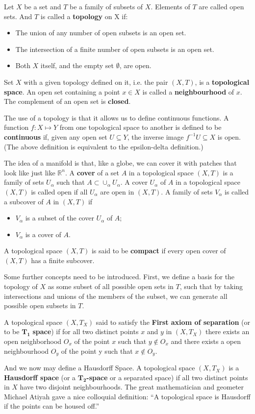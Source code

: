\documentclass[a4paper,11pt]{article}
\theoremstyle{remark}
\begin{document}
Let $X$ be a set and $T$ be a family of subsets of $X$. Elements of $T$
are called open sets. And $T$ is called a \textbf{topology} on X if: 
\begin{itemize}
\item The union of any number of open subsets is an open set.
\item The intersection of a finite number of open subsets is an open set.
\item Both $X$ itself, and the empty set $\emptyset$, are open.
\end{itemize}
Set $X$ with a given topology defined on it, i.e. the pair $(X,T)$, is a
\textbf{topological space}. An open set containing a point $x\in X$ is
called a \textbf{neighbourhood} of $x$. The complement of an open set is \textbf{closed}.
\par
The use of a topology is that it allows us to define continuous
functions. A function $f: X \mapsto Y$ from one topological space to
another is defined to be \textbf{continuous} if, given any open set $U
\subseteq Y$, the inverse image $f^{-1}U \subseteq X$ is open. (The
above definition is equivalent to the epsilon-delta definition.)\par
The idea of a manifold is that, like a globe, we can cover it with
patches that look like just like $\mathbb{R}^n$. A \textbf{cover} of a set $A$
in a topological space $(X,T)$ is a family of sets ${U_\alpha}$ such
that $A\subset\cup_{\alpha}U_{\alpha}$. A cover ${U_{\alpha}}$ of $A$
in a topological space $(X,T)$ is called open if all $U_{\alpha}$ are
open in $(X,T)$. A family of sets ${V_{\alpha}}$ is called a subcover
of $A$ in $(X,T)$ if
\begin{itemize}
\item ${V_{\alpha}}$ is a subset of the cover ${U_{\alpha}}$ of $A$;
\item ${V_{\alpha}}$ is a cover of $A$.
\end{itemize}
A topological space $(X,T)$ is said to be \textbf{compact} if every open
cover of $(X,T)$ has a finite subcover.\par
Some further concepts need to be introduced. First, we define a basis
for the topology of $X$ as some subset of all possible open sets in
$T$, such that by taking intersections and unions of the members of
the subset, we can generate all possible open subsets in $T$.\par A
topological space $(X,T_X)$ said to satisfy the \textbf{First axiom of
  separation} (or to be $\mathbf{T_1}$ \textbf{space}) if for all two
distinct points $x$ and $y$ in $(X,T_X)$ there exists an open
neighborhood $O_x$ of the point $x$ such that $y\not\in O_x$ and there
exists a open neighbourhood $O_y$ of the point y such that $x\not\in
O_y$.\par And we now may define a Hausdorff Space. A topological space
$(X,T_X)$ is a \textbf{Hausdorff space} (or a $\mathbf{T_2}$\textbf{-space} or
a separated space) if all two distinct points in $X$ have two disjoint
neighbourhoods. The great mathematician and geometer Michael Atiyah gave a nice
colloquial definition: ``A topological space is Hausdorff if the points
can be housed off.'' 
\end{document}
